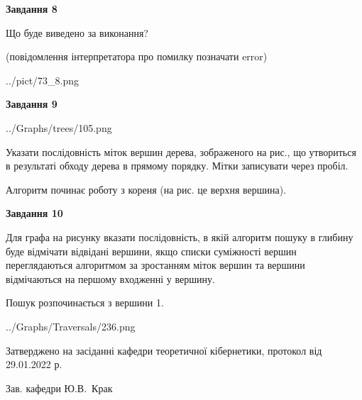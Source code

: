 \documentclass[12pt, ukrainian]{article}
\begin{document}
{\begin {large}
{\begin {center}\textbf{Завдання 8}\end {center}}\par
Що буде виведено за виконання?\par
 (повідомлення інтерпретатора про помилку позначати error)\par
\begin{center}
	{../pict/73_8.png}
\end{center}
\newpage

{\begin {center}\textbf{Завдання 9}\end {center}}\par

\begin{center}
	{../Graphs/trees/105.png}
\end{center}
Указати послідовність міток вершин дерева, зображеного на рис., що утвориться в результаті обходу дерева в прямому порядку. Мітки записувати через пробіл.\par Алгоритм починає роботу з кореня (на рис. це верхня вершина).\par
\newpage

{\begin {center}\textbf{Завдання 10}\end {center}}\par
Для графа на рисунку вказати послідовність, в якій алгоритм пошуку в глибину буде відмічати відвідані вершини, якщо списки суміжності вершин переглядаються алгоритмом за зростанням міток вершин та вершини відмічаються на першому вход\-женні у вершину.\par
Пошук розпочинається з вершини 1.\par

\begin{center}
	{../Graphs/Traversals/236.png}
\end{center}\par
\newpage


\end {large}
}
{\smallskip \begin {small} Затверджено на засіданні кафедри теоретичної кібернетики, протокол  від   29.01.2022 р.\par\smallskip\smallskip
{\parbox {6.5 cm}{Зав. кафедри \dotfill Ю.В.~Крак}} \end{small}}
\end{document}

